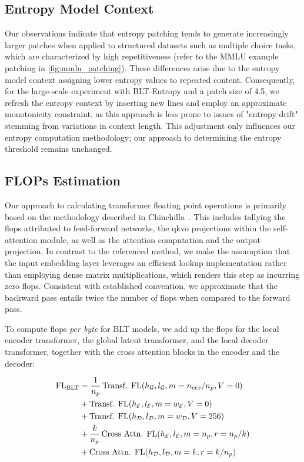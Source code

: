 \subsection{Entropy Model Context}
\label{section:entropy-context}
Our observations indicate that entropy patching tends to generate increasingly larger patches when applied to structured datasets such as multiple choice tasks, which are characterized by high repetitiveness (refer to the MMLU example patching in \autoref{fig:mmlu_patching}). These differences arise due to the entropy model context assigning lower entropy values to repeated content. Consequently, for the large-scale experiment with {\textsc BLT}-Entropy and a patch size of 4.5, we refresh the entropy context by inserting new lines and employ an approximate monotonicity constraint, as this approach is less prone to issues of "entropy drift" stemming from variations in context length. This adjustment only influences our entropy computation methodology; our approach to determining the entropy threshold remains unchanged.

\subsection{FLOPs Estimation} 
\label{section:flops}

Our approach to calculating transformer floating point operations is primarily based on the methodology described in Chinchilla~\citep{hoffmann2022training}. This includes tallying the flops attributed to feed-forward networks, the qkvo projections within the self-attention module, as well as the attention computation and the output projection. In contrast to the referenced method, we make the assumption that the input embedding layer leverages an efficient lookup implementation rather than employing dense matrix multiplications, which renders this step as incurring zero flops. Consistent with established convention, we approximate that the backward pass entails twice the number of flops when compared to the forward pass.

To compute flops \textit{per byte} for {\textsc BLT} models, we add up the flops for the local encoder transformer, the global latent transformer, and the local decoder transformer, together with the cross attention blocks in the encoder and the decoder:

\begin{align}
    \text{FL}_{\text{{\textsc BLT}}} &= \frac{1}{n_p} \, \text{Transf. FL}(h_{\mathcal{G}}, l_{\mathcal{G}}, m=n_{ctx}/n_p, V=0) \\
   &+ \text{Transf. FL}(h_{\mathcal{E}}, l_{\mathcal{E}}, m=w_{\mathcal{E}}, V=0) \\
   &+ \text{Transf. FL}(h_{\mathcal{D}}, l_{\mathcal{D}}, m=w_{\mathcal{D}}, V=256) \\ 
    &+ \frac{k}{n_p} \, \text{Cross Attn. FL}(h_{\mathcal{E}}, l_{\mathcal{E}}, m=n_p, r=n_p/k) \\ 
   &+ \text{Cross Attn. FL}(h_{\mathcal{D}}, l_{\mathcal{D}}, m=k, r=k/n_p) 
\end{align}

